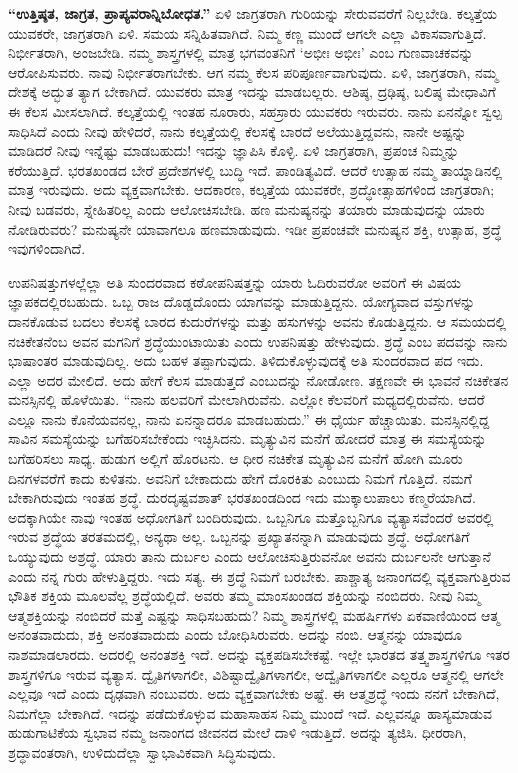 \textbf{“ಉತ್ತಿಷ್ಠತ, ಜಾಗ್ರತ, ಪ್ರಾಪ್ಯವರಾನ್ನಿಬೋಧತ.”} ಏಳಿ ಜಾಗ್ರತರಾಗಿ ಗುರಿಯನ್ನು ಸೇರುವವರೆಗೆ ನಿಲ್ಲಬೇಡಿ. ಕಲ್ಕತ್ತೆಯ ಯುವಕರೇ, ಜಾಗ್ರತರಾಗಿ ಏಳಿ. ಸಮಯ ಸನ್ನಿಹಿತವಾಗಿದೆ. ನಿಮ್ಮ ಕಣ್ಣ ಮುಂದೆ ಆಗಲೇ ಎಲ್ಲಾ ವಿಕಾಸವಾಗುತ್ತಿದೆ. ನಿರ್ಭೀತರಾಗಿ, ಅಂಜಬೇಡಿ. ನಮ್ಮ ಶಾಸ್ತ್ರಗಳಲ್ಲಿ ಮಾತ್ರ ಭಗವಂತನಿಗೆ ‘ಅಭೀಃ ಅಭೀಃ’ ಎಂಬ ಗುಣವಾಚಕವನ್ನು ಆರೋಪಿಸುವರು. ನಾವು ನಿರ್ಭೀತರಾಗಬೇಕು. ಆಗ ನಮ್ಮ ಕೆಲಸ ಪರಿಪೂರ್ಣವಾಗುವುದು. ಏಳಿ, ಜಾಗ್ರತರಾಗಿ, ನಮ್ಮ ದೇಶಕ್ಕೆ ಅದ್ಭುತ ತ್ಯಾಗ ಬೇಕಾಗಿದೆ. ಯುವಕರು ಮಾತ್ರ ಇದನ್ನು ಮಾಡಬಲ್ಲರು. ಆಶಿಷ್ಠ, ದ್ರಢಿಷ್ಠ, ಬಲಿಷ್ಠ ಮೇಧಾವಿಗೆ ಈ ಕೆಲಸ ಮೀಸಲಾಗಿದೆ. ಕಲ್ಕತ್ತೆಯಲ್ಲಿ ಇಂತಹ ನೂರಾರು, ಸಹಸ್ರಾರು ಯುವಕರು ಇರುವರು. ನಾನು ಏನನ್ನೋ ಸ್ವಲ್ಪ ಸಾಧಿಸಿದೆ ಎಂದು ನೀವು ಹೇಳಿದರೆ, ನಾನು ಕಲ್ಕತ್ತೆಯಲ್ಲಿ ಕೆಲಸಕ್ಕೆ ಬಾರದೆ ಅಲೆಯುತ್ತಿದ್ದವನು, ನಾನೇ ಅಷ್ಟನ್ನು ಮಾಡಿದರೆ ನೀವು ಇನ್ನೆಷ್ಟು ಮಾಡಬಹುದು! ಇದನ್ನು ಜ್ಞಾಪಿಸಿ ಕೊಳ್ಳಿ. ಏಳಿ ಜಾಗ್ರತರಾಗಿ, ಪ್ರಪಂಚ ನಿಮ್ಮನ್ನು ಕರೆಯುತ್ತಿದೆ. ಭರತಖಂಡದ ಬೇರೆ ಪ್ರದೇಶಗಳಲ್ಲಿ ಬುದ್ಧಿ ಇದೆ. ಪಾಂಡಿತ್ಯವಿದೆ. ಆದರೆ ಉತ್ಸಾಹ ನಮ್ಮ ತಾಯ್ನಾಡಿನಲ್ಲಿ ಮಾತ್ರ ಇರುವುದು. ಅದು ವ್ಯಕ್ತವಾಗಬೇಕು. ಆದಕಾರಣ, ಕಲ್ಕತ್ತೆಯ ಯುವಕರೇ, ಶ್ರದ್ಧೋತ್ಸಾಹಗಳಿಂದ ಜಾಗ್ರತರಾಗಿ; ನೀವು ಬಡವರು, ಸ್ನೇಹಿತರಿಲ್ಲ ಎಂದು ಆಲೋಚಿಸಬೇಡಿ. ಹಣ ಮನುಷ್ಯನನ್ನು ತಯಾರು ಮಾಡುವುದನ್ನು ಯಾರು ನೋಡಿರುವರು? ಮನುಷ್ಯನೇ ಯಾವಾಗಲೂ ಹಣಮಾಡುವುದು. ಇಡೀ ಪ್ರಪಂಚವೇ ಮನುಷ್ಯನ ಶಕ್ತಿ, ಉತ್ಸಾಹ, ಶ್ರದ್ಧೆ ಇವುಗಳಿಂದಾಗಿದೆ.

ಉಪನಿಷತ್ತುಗಳಲ್ಲೆಲ್ಲಾ ಅತಿ ಸುಂದರವಾದ ಕಠೋಪನಿಷತ್ತನ್ನು ಯಾರು ಓದಿರುವರೋ ಅವರಿಗೆ ಈ ವಿಷಯ ಜ್ಞಾಪಕದಲ್ಲಿರಬಹುದು. ಒಬ್ಬ ರಾಜ ದೊಡ್ಡದೊಂದು ಯಾಗವನ್ನು ಮಾಡುತ್ತಿದ್ದನು. ಯೋಗ್ಯವಾದ ವಸ್ತುಗಳನ್ನು ದಾನಕೊಡುವ ಬದಲು ಕೆಲಸಕ್ಕೆ ಬಾರದ ಕುದುರೆಗಳನ್ನು ಮತ್ತು ಹಸುಗಳನ್ನು ಅವನು ಕೊಡುತ್ತಿದ್ದನು. ಆ ಸಮಯದಲ್ಲಿ ನಚಿಕೇತನೆಂಬ ಅವನ ಮಗನಿಗೆ ಶ್ರದ್ಧೆಯುಂಟಾಯಿತು ಎಂದು ಉಪನಿಷತ್ತು ಹೇಳುವುದು. ಶ್ರದ್ಧೆ ಎಂಬ ಪದವನ್ನು ನಾನು ಭಾಷಾಂತರ ಮಾಡುವುದಿಲ್ಲ. ಅದು ಬಹಳ ತಪ್ಪಾಗುವುದು. ತಿಳಿದುಕೊಳ್ಳುವುದಕ್ಕೆ ಅತಿ ಸುಂದರವಾದ ಪದ ಇದು. ಎಲ್ಲಾ ಅದರ ಮೇಲಿದೆ. ಅದು ಹೇಗೆ ಕೆಲಸ ಮಾಡುತ್ತದೆ ಎಂಬುದನ್ನು ನೋಡೋಣ. ತಕ್ಷಣವೇ ಈ ಭಾವನೆ ನಚಿಕೇತನ ಮನಸ್ಸಿನಲ್ಲಿ ಹೊಳೆಯಿತು. “ನಾನು ಹಲವರಿಗೆ ಮೇಲಾಗಿರುವೆನು. ಎಲ್ಲೋ ಕೆಲವರಿಗೆ ಮಧ್ಯದಲ್ಲಿರುವೆನು. ಆದರೆ ಎಲ್ಲೂ ನಾನು ಕೊನೆಯವನಲ್ಲ, ನಾನು ಏನನ್ನಾದರೂ ಮಾಡಬಹುದು.” ಈ ಧೈರ್ಯ ಹೆಚ್ಚಾಯಿತು. ಮನಸ್ಸಿನಲ್ಲಿದ್ದ ಸಾವಿನ ಸಮಸ್ಯೆಯನ್ನು ಬಗೆಹರಿಸಬೇಕೆಂದು ಇಚ್ಛಿಸಿದನು. ಮೃತ್ಯುವಿನ ಮನೆಗೆ ಹೋದರೆ ಮಾತ್ರ ಈ ಸಮಸ್ಯೆಯನ್ನು ಬಗೆಹರಿಸಲು ಸಾಧ್ಯ. ಹುಡುಗ ಅಲ್ಲಿಗೆ ಹೊರಟನು. ಆ ಧೀರ ನಚಿಕೇತ ಮೃತ್ಯುವಿನ ಮನೆಗೆ ಹೋಗಿ ಮೂರು ದಿನಗಳವರೆಗೆ ಕಾದು ಕುಳಿತನು. ಅವನಿಗೆ ಬೇಕಾದುದು ಹೇಗೆ ದೊರಕಿತು ಎಂಬುದು ನಿಮಗೆ ಗೊತ್ತಿದೆ. ನಮಗೆ ಬೇಕಾಗಿರುವುದು ಇಂತಹ ಶ್ರದ್ಧೆ. ದುರದೃಷ್ಟವಶಾತ್​ ಭರತಖಂಡದಿಂದ ಇದು ಮುಕ್ಕಾಲುಪಾಲು ಕಣ್ಮರೆಯಾಗಿದೆ. ಅದಕ್ಕಾಗಿಯೇ ನಾವು ಇಂತಹ ಅಧೋಗತಿಗೆ ಬಂದಿರುವುದು. ಒಬ್ಬನಿಗೂ ಮತ್ತೊಬ್ಬನಿಗೂ ವ್ಯತ್ಯಾಸವೆಂದರೆ ಅವರಲ್ಲಿ ಇರುವ ಶ್ರದ್ಧೆಯ ತರತಮದಲ್ಲಿ, ಅನ್ಯಥಾ ಅಲ್ಲ. ಒಬ್ಬನನ್ನು ಪ್ರಖ್ಯಾತನನ್ನಾಗಿ ಮಾಡುವುದು ಶ್ರದ್ಧೆ. ಅಧೋಗತಿಗೆ ಒಯ್ಯುವುದು ಅಶ್ರದ್ಧೆ. ಯಾರು ತಾನು ದುರ್ಬಲ ಎಂದು ಆಲೋಚಿಸುತ್ತಿರುವನೋ ಅವನು ದುರ್ಬಲನೇ ಆಗುತ್ತಾನೆ ಎಂದು ನನ್ನ ಗುರು ಹೇಳುತ್ತಿದ್ದರು. ಇದು ಸತ್ಯ. ಈ ಶ್ರದ್ಧೆ ನಿಮಗೆ ಬರಬೇಕು. ಪಾಶ್ಚಾತ್ಯ ಜನಾಂಗದಲ್ಲಿ ವ್ಯಕ್ತವಾಗುತ್ತಿರುವ ಭೌತಿಕ ಶಕ್ತಿಯ ಮೂಲವೆಲ್ಲ ಶ್ರದ್ಧೆಯಲ್ಲಿದೆ. ಅವರು ತಮ್ಮ ಮಾಂಸಖಂಡದ ಶಕ್ತಿಯನ್ನು ನಂಬಿದರು. ನೀವು ನಿಮ್ಮ ಆತ್ಮಶಕ್ತಿಯನ್ನು ನಂಬಿದರೆ ಮತ್ತೆ ಎಷ್ಟನ್ನು ಸಾಧಿಸಬಹುದು? ನಿಮ್ಮ ಶಾಸ್ತ್ರಗಳಲ್ಲಿ ಮಹರ್ಷಿಗಳು ಏಕವಾಣಿಯಿಂದ ಆತ್ಮ ಅನಂತವಾದುದು, ಶಕ್ತಿ ಅನಂತವಾದುದು ಎಂದು ಬೋಧಿಸಿರುವರು. ಅದನ್ನು ನಂಬಿ. ಆತ್ಮನನ್ನು ಯಾವುದೂ ನಾಶಮಾಡಲಾರದು. ಅದರಲ್ಲಿ ಅನಂತಶಕ್ತಿ ಇದೆ. ಅದನ್ನು ವ್ಯಕ್ತಪಡಿಸಬೇಕಷ್ಟೆ. ಇಲ್ಲೇ ಭಾರತದ ತತ್ತ್ವಶಾಸ್ತ್ರಗಳಿಗೂ ಇತರ ಶಾಸ್ತ್ರಗಳಿಗೂ ಇರುವ ವ್ಯತ್ಯಾಸ. ದ್ವೈತಿಗಳಾಗಲೀ, ವಿಶಿಷ್ಟಾದ್ವೈತಿಗಳಾಗಲೀ, ಅದ್ವೈತಿಗಳಾಗಲೀ ಎಲ್ಲರೂ ಆತ್ಮನಲ್ಲಿ ಆಗಲೇ ಎಲ್ಲವೂ ಇದೆ ಎಂದು ದೃಢವಾಗಿ ನಂಬುವರು. ಅದು ವ್ಯಕ್ತವಾಗಬೇಕು ಅಷ್ಟೆ. ಈ ಆತ್ಮಶ್ರದ್ಧೆ ಇಂದು ನನಗೆ ಬೇಕಾಗಿದೆ, ನಿಮಗೆಲ್ಲಾ ಬೇಕಾಗಿದೆ. ಇದನ್ನು ಪಡೆದುಕೊಳ್ಳುವ ಮಹಾಸಾಹಸ ನಿಮ್ಮ ಮುಂದೆ ಇದೆ. ಎಲ್ಲವನ್ನೂ ಹಾಸ್ಯಮಾಡುವ ಹುಡುಗಾಟಿಕೆಯ ಸ್ವಭಾವ ನಮ್ಮ ಜನಾಂಗದ ಜೀವನದ ಮೇಲೆ ದಾಳಿ ಇಡುತ್ತಿದೆ. ಅದನ್ನು ತ್ಯಜಿಸಿ. ಧೀರರಾಗಿ, ಶ್ರದ್ಧಾವಂತರಾಗಿ, ಉಳಿದುದೆಲ್ಲಾ ಸ್ವಾಭಾವಿಕವಾಗಿ ಸಿದ್ಧಿಸುವುದು.

